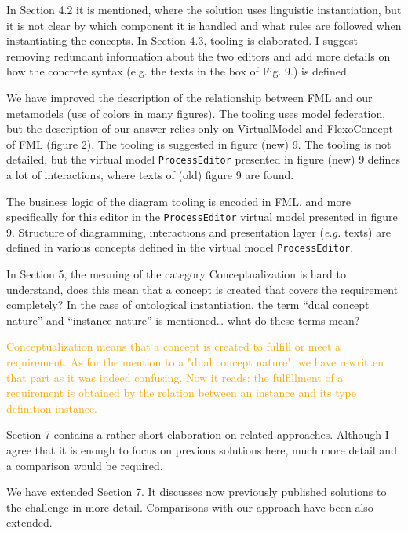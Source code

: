 \documentclass[10pt]{article}
\begin{document}
\begin{response}{In Section 4.2 it is mentioned, where the solution uses linguistic instantiation, but it is not clear by which component it is handled and what rules are followed when instantiating the concepts. In Section 4.3, tooling is elaborated. I suggest removing redundant information about the two editors and add more details on how the concrete syntax (e.g. the texts in the box of Fig. 9.) is defined.}

We have improved the description of the relationship between FML and our metamodels (use of colors in many figures).
The tooling uses model federation, but the description of our answer relies only on \textsf{VirtualModel} and \textsf{FlexoConcept} of FML (figure 2). The tooling is suggested in figure (new) 9. The tooling is not detailed, but the virtual model \texttt{ProcessEditor} presented in figure (new) 9 defines a lot of interactions, where texts of (old) figure 9 are found.

The business logic of the diagram tooling is encoded in FML, and more specifically for this editor in the \texttt{ProcessEditor} virtual model presented in figure 9. Structure of diagramming, interactions and presentation layer (\emph{e.g.} texts) are defined in various concepts defined in the virtual model \texttt{ProcessEditor}.
\end{response}

\begin{response}{In Section 5, the meaning of the category Conceptualization is hard to understand, does this mean that a concept is created that covers the requirement completely? In the case of ontological instantiation, the term “dual concept nature” and “instance nature” is mentioned… what do these terms mean?}


\textcolor{orange}{Conceptualization means that a concept is created to fulfill or meet a requirement. As for the mention to a "dual concept nature", we have rewritten that part as it was indeed confusing. Now it reads: the fulfillment of a requirement is obtained by the relation between an instance and its type definition instance.} 

\end{response}

\begin{response}{Section 7 contains a rather short elaboration on related approaches. Although I agree that it is enough to focus on previous solutions here, much more detail and a comparison would be required.}

We have extended Section 7. It discusses now previously published solutions to the challenge in more detail. Comparisons with our approach have been also extended.

\end{response}
\end{document}
